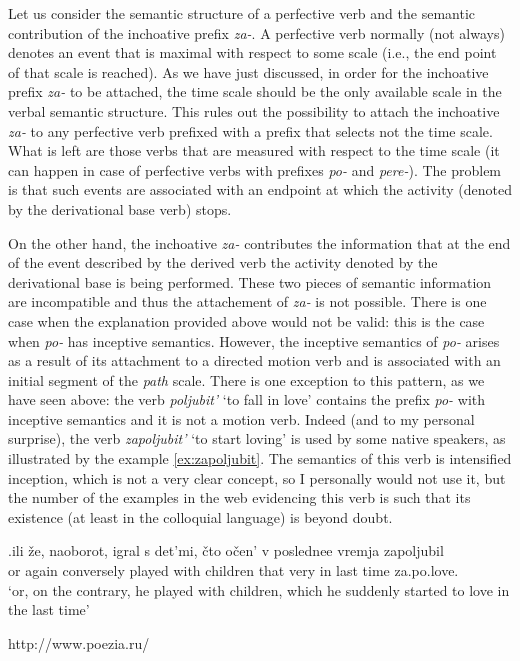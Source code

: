 Let us consider the semantic structure of a perfective verb and the semantic contribution of the inchoative prefix \textit{za-}. A perfective verb normally (not always) denotes an event that is maximal with respect to some scale (i.e., the end point of that scale is reached). As we have just discussed, in order for the inchoative prefix \textit{za-} to be attached, the time scale should be the only available scale in the verbal semantic structure. This rules out the possibility to attach the inchoative \textit{za-} to any perfective verb prefixed with a prefix that selects not the time scale. What is left are those verbs that are measured with respect to the time scale (it can happen in case of perfective verbs with prefixes \textit{po-} and \textit{pere-}). The problem is that such events are associated with an endpoint at which the activity (denoted by the derivational base verb) stops. 

On the other hand, the inchoative \textit{za-} contributes the information that at the end of the event described by the derived verb the activity denoted by the derivational base is being performed. These two pieces of semantic information are incompatible and thus the attachement of \textit{za-} is not possible. There is one case when the explanation provided above would not be valid: this is the case when \textit{po-} has inceptive semantics. However, the inceptive semantics of \textit{po-} arises as a result of its attachment to a directed motion verb and is associated with an initial segment of the \textit{path} scale. There is one exception to this pattern, as we have seen above: the verb \textit{poljubit'} `to fall in love' contains the prefix \textit{po-} with inceptive semantics and it is not a motion verb. Indeed (and to my personal surprise), the verb \textit{zapoljubit'} `to start loving' is used by some native speakers, as illustrated by the example \ref{ex:zapoljubit}. The semantics of this verb is intensified inception, which is not a very clear concept, so I personally would not use it, but the number of the examples in the web evidencing this verb is such that its existence (at least in the colloquial language) is beyond doubt.

\exg.\label{ex:zapoljubit}ili \v{z}e, naoborot, igral s det'mi, \v{c}to o\v{c}en' v poslednee vremja zapoljubil\\
or again conversely played with children that very in last time za.po.love.\\
\vspace{0.5em}
`or, on the contrary, he played with children, which he suddenly started to love in the last time'
\begin{flushright}
\vspace{-0.5em}
http://www.poezia.ru/
\end{flushright}

